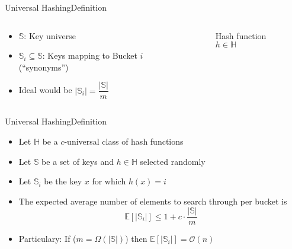 \begin{frame}{Universal Hashing}{Definition}
  \begin{columns}
    \begin{column}{0.5\linewidth}
      \begin{itemize}
        \item
          {\color{Mittel-Blau}$\mathbb{S}$}:
          Key universe
        \item
          {\color{Mittel-Blau}$\mathbb{S}_i \subseteq \mathbb{S}$}:
          Keys mapping to Bucket {\color{Mittel-Blau}$i$} (\enquote{synonyms})
       \item
         Ideal would be
         {\color{Mittel-Blau}$\vert \mathbb{S}_i \vert =\dfrac{\vert \mathbb{S} \vert}{m}$}
      \end{itemize}
    \end{column}
    \begin{column}{0.5\linewidth}
      \begin{figure}[!h]%
        \begin{adjustbox}{width=\linewidth}%
        \end{adjustbox}
        \caption{Hash function {\color{Mittel-Blau}$h \in \mathbb{H}$}}%
        \label{fig:universal_hashing:hash_function_to_bucket}
      \end{figure}
    \end{column}
  \end{columns}
\end{frame}


\begin{frame}{Universal Hashing}{Definition}
  \begin{itemize}
    \item<1->
      Let {\color{Mittel-Blau}$\mathbb{H}$} be a {\color{Mittel-Blau}$c$}-universal class of hash functions
    \item<2->
      Let {\color{Mittel-Blau}$\mathbb{S}$} be a set of keys and {\color{Mittel-Blau}$h \in \mathbb{H}$} selected randomly
    \item<3->
      Let {\color{Mittel-Blau}$\mathbb{S}_i$} be the key {\color{Mittel-Blau}$x$} for which {\color{Mittel-Blau}$h(x) = i$}
    \item<4->
      The expected average number of elements to search through per 
      bucket is {\color{Mittel-Blau}\[\mathbb{E}\left[\vert \mathbb{S}_i \vert\right]
        \leq 1 + c \cdot \frac{\vert \mathbb{S} \vert}{m}\]}
    \item<5->
      Particulary: If  {\color{Mittel-Blau}($m = \Omega(\vert \mathbb{S} \vert)$)} then
      {\color{Mittel-Blau}$\mathbb{E}\left[\vert \mathbb{S}_i \vert\right] = \mathcal{O}(n)$}
  \end{itemize}
\end{frame}
